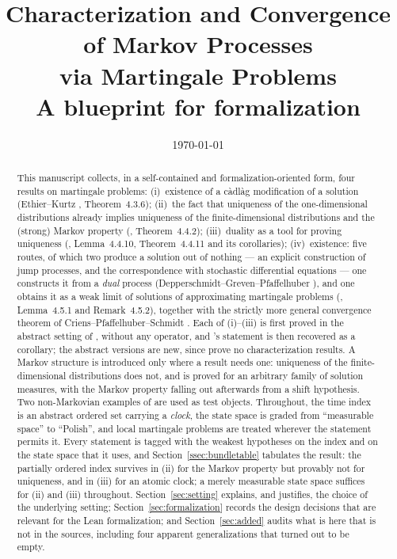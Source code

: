 \documentclass[11pt,a4paper]{article}
\title{Characterization and Convergence of Markov Processes\\
       via Martingale Problems\\[2ex]
       \large A blueprint for formalization}
\author{}
\date{\today}
\theoremstyle{plain}
\theoremstyle{definition}
\theoremstyle{remark}
\newcommand{\DGP}{\cite{DGP24}}
\newcommand{\EK}{\cite{EK86}}
\newcommand{\CPS}{\cite{CPS23}}
\begin{document}
\maketitle

\begin{abstract}
This manuscript collects, in a self-contained and formalization-oriented form,
four results on martingale problems:
(i)~existence of a c\`adl\`ag modification of a solution
(Ethier--Kurtz \EK, Theorem~4.3.6);
(ii)~the fact that uniqueness of the one-dimensional distributions already implies
uniqueness of the finite-dimensional distributions and the (strong) Markov property
(\EK, Theorem~4.4.2);
(iii)~duality as a tool for proving uniqueness
(\EK, Lemma~4.4.10, Theorem~4.4.11 and its corollaries);
(iv)~existence: five routes, of which two produce a solution out of nothing ---
an explicit construction of jump processes, and the correspondence with
stochastic differential equations --- one constructs it from a \emph{dual}
process (Depperschmidt--Greven--Pfaffelhuber \DGP), and one obtains it as a weak
limit of solutions of approximating martingale problems (\EK, Lemma~4.5.1 and
Remark~4.5.2), together with the strictly more general convergence theorem of
Criens--Pfaffelhuber--Schmidt \CPS.
Each of (i)--(iii) is first proved in the abstract setting of \CPS, without any
operator, and \EK's statement is then recovered as a corollary; the abstract
versions are new, since \CPS{} prove no characterization results.  A Markov
structure is introduced only where a result needs one: uniqueness of the
finite-dimensional distributions does not, and is proved for an arbitrary family
of solution measures, with the Markov property falling out afterwards from a
shift hypothesis.  Two non-Markovian examples of \CPS{} are used as test objects.  Throughout,
the time index is an abstract ordered set carrying a \emph{clock}, the state
space is graded from ``measurable space'' to ``Polish'', and local martingale
problems are treated wherever the statement permits it.  Every statement is
tagged with the weakest hypotheses on the index and on the state space that it
uses, and Section~\ref{ssec:bundletable} tabulates the result: the partially
ordered index survives in (ii) for the Markov property but provably not for
uniqueness, and in (iii) for an atomic clock; a merely measurable state space
suffices for (ii) and (iii) throughout.
Section~\ref{sec:setting} explains, and justifies, the choice of the underlying
setting; Section~\ref{sec:formalization} records the design decisions that are
relevant for the Lean formalization; and Section~\ref{sec:added} audits what is
here that is not in the sources, including four apparent generalizations that
turned out to be empty.
\end{abstract}
\end{document}
